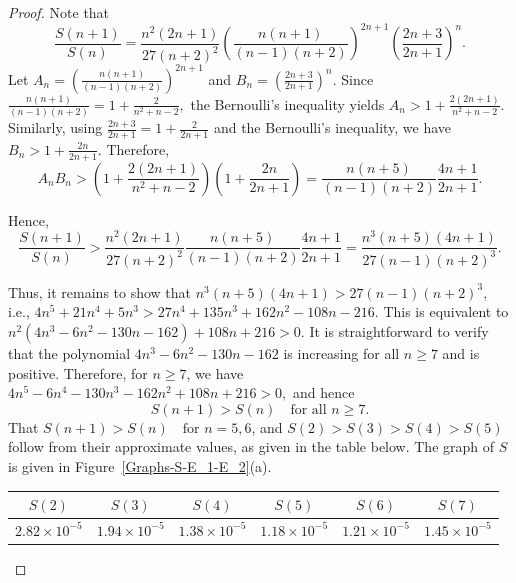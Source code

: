 \documentclass[12pt]{article}
\begin{document}
	\begin{proof}
		Note that
		$$\frac{S(n+1)}{S(n)}=\frac{n^2(2n+1)}{27(n+2)^2}\left(\frac{n(n+1)}{(n-1)(n+2)}\right)^{2n+1} \left(\frac{2n+3}{2n+1}\right)^n.$$
		Let
	 $A_n =\left(\frac{n(n+1)}{(n-1)(n+2)}\right)^{2n+1}$ and $ B_n =\left(\frac{2n+3}{2n+1}\right)^n.$ 
		Since
		 $\frac{n(n+1)}{(n-1)(n+2)}=1+\frac{2}{n^2+n-2},$ 
	the Bernoulli's inequality yields
		 $A_n>1+\frac{2(2n+1)}{n^2+n-2}.$ 
Similarly, using
		 $\frac{2n+3}{2n+1}=1+\frac{2}{2n+1}$ 
		and the Bernoulli's inequality, we have
		 $B_n>1+\frac{2n}{2n+1}.$ 
		Therefore,
		$$A_nB_n>\left(1+\frac{2(2n+1)}{n^2+n-2}\right)\left(1+\frac{2n}{2n+1}\right)= \frac{n(n+5)}{(n-1)(n+2)}   \frac{4n+1}{2n+1}.$$
 	 
		Hence,
		$$\frac{S(n+1)}{S(n)}>\frac{n^2(2n+1)}{27(n+2)^2}   \frac{n(n+5)}{(n-1)(n+2)}   \frac{4n+1}{2n+1}=\frac{n^3(n+5)(4n+1)}{27(n-1)(n+2)^3}.$$
	 
		Thus, it remains to show that
	 $n^3(n+5)(4n+1)>27(n-1)(n+2)^3,$ i.e.,  
	 $4n^5+21n^4+5n^3>27n^4+135n^3+162n^2-108n-216.$ 
		This is equivalent to $n^2(4n^3-6n^2-130n-162)+108n+216>0$.
		It is straightforward to verify that the polynomial $4n^3-6n^2-130n-162$ is increasing for all $n \geq 7$ and is positive. Therefore, for $n\geq 7$, we have
		 $4n^5-6n^4-130n^3-162n^2+108n+216>0,$ 
		and hence
		$$S(n+1)>S(n) \quad \text{for all } n \geq 7.$$
		That  $S(n+1)>S(n) \quad \text{for } n=5,6$, and $S(2)>S(3)>S(4)>S(5)$ follow from their approximate values, as given in the table below. The graph of $S$ is given in Figure~\ref{Graphs-S-E_1-E_2}(a).
		
		\begin{table}[h]
			\centering
			\begin{tabular}{|c|c|c|c|c|c|}
				\hline
				$S(2)$ & $S(3)$ & $S(4)$ & $S(5)$ & $S(6)$ & $S(7)$ \\ \hline
				$2.82 \times 10^{-5}$ & $1.94 \times 10^{-5}$ & $1.38  \times 10^{-5}$  & $1.18  \times 10^{-5}$ & $1.21  \times 10^{-5}$ & $1.45   \times 10^{-5}$  \\ \hline
			\end{tabular}
		\end{table}
\end{proof}		
\end{document}
